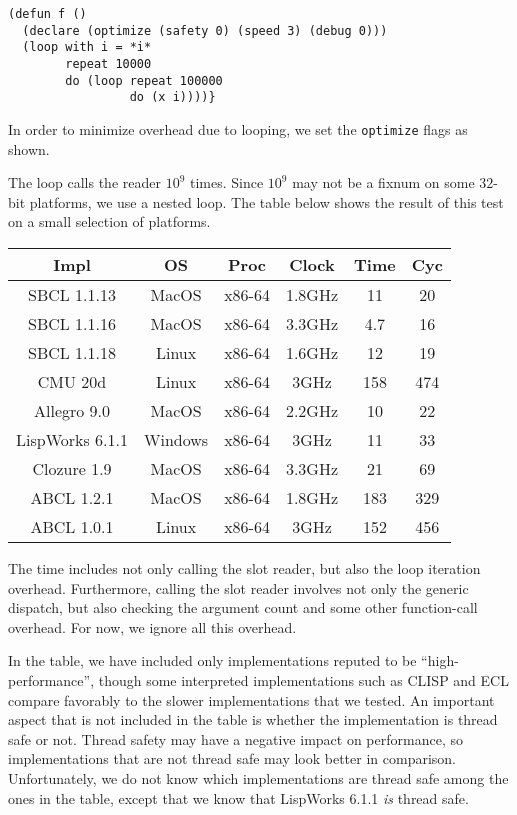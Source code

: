 {\small\begin{verbatim}
(defun f ()
  (declare (optimize (safety 0) (speed 3) (debug 0)))
  (loop with i = *i*
        repeat 10000
        do (loop repeat 100000
                 do (x i))))}
\end{verbatim}

In order to minimize overhead due to looping, we set the
\texttt{optimize} flags as shown.

The loop calls the reader $10^9$ times.  Since $10^9$ may not be a
fixnum on some $32$-bit platforms, we use a nested loop.  The table
below shows the result of this test on a small selection of platforms.

{\small\begin{tabular}{|c|c|c|c|c|c|}
\hline
Impl & OS & Proc & Clock & Time & Cyc\\
\hline\hline
SBCL 1.1.13 & MacOS & x86-64 & 1.8GHz & 11 & 20 \\
SBCL 1.1.16 & MacOS & x86-64 & 3.3GHz & 4.7 & 16 \\
SBCL 1.1.18 & Linux & x86-64 & 1.6GHz & 12 & 19\\
CMU 20d & Linux & x86-64 & 3GHz & 158 & 474\\
Allegro 9.0 & MacOS & x86-64 & 2.2GHz & 10 & 22\\
LispWorks 6.1.1 & Windows & x86-64 & 3GHz & 11 & 33\\
Clozure 1.9 & MacOS & x86-64 & 3.3GHz & 21 & 69\\
ABCL 1.2.1 & MacOS & x86-64 & 1.8GHz & 183 & 329\\
ABCL 1.0.1 & Linux & x86-64 & 3GHz & 152 & 456\\
\hline
\end{tabular}}

The time includes not only calling the slot reader, but also the loop
iteration overhead.  Furthermore, calling the slot reader involves not
only the generic dispatch, but also checking the argument count and
some other function-call overhead.  For now, we ignore all this
overhead.

In the table, we have included only implementations reputed to be
``high-performance'', though some interpreted implementations such as
CLISP and ECL compare favorably to the slower implementations that we
tested.  An important aspect that is not included in the table is
whether the implementation is thread safe or not.  Thread safety may
have a negative impact on performance, so implementations that are not
thread safe may look better in comparison.  Unfortunately, we do not
know which implementations are thread safe among the ones in the
table, except that we know that LispWorks 6.1.1 \emph{is} thread
safe. 

}
